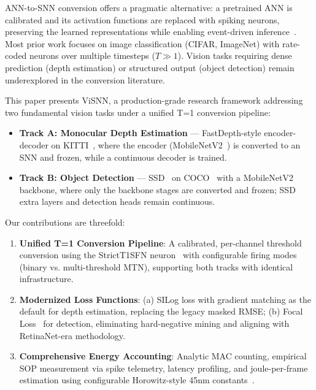 \documentclass[10pt,conference]{IEEEtran}
\begin{document}
ANN-to-SNN conversion offers a pragmatic alternative: a pretrained ANN is calibrated and its activation functions are replaced with spiking neurons, preserving the learned representations while enabling event-driven inference~\cite{cao2015spiking, diehl2015fast, rueckauer2017conversion}. Most prior work focuses on image classification (CIFAR, ImageNet) with rate-coded neurons over multiple timesteps ($T \gg 1$). Vision tasks requiring dense prediction (depth estimation) or structured output (object detection) remain underexplored in the conversion literature.

This paper presents ViSNN, a production-grade research framework addressing two fundamental vision tasks under a unified T=1 conversion pipeline:

\begin{itemize}
    \item \textbf{Track A: Monocular Depth Estimation} — FastDepth-style encoder-decoder on KITTI~\cite{geiger2012we}, where the encoder (MobileNetV2~\cite{sandler2018mobilenetv2}) is converted to an SNN and frozen, while a continuous decoder is trained.
    \item \textbf{Track B: Object Detection} — SSD~\cite{liu2016ssd} on COCO~\cite{lin2014microsoft} with a MobileNetV2 backbone, where only the backbone stages are converted and frozen; SSD extra layers and detection heads remain continuous.
\end{itemize}

Our contributions are threefold:

\begin{enumerate}
    \item \textbf{Unified T=1 Conversion Pipeline}: A calibrated, per-channel threshold conversion using the StrictT1SFN neuron~\cite{kim2023scale} with configurable firing modes (binary vs. multi-threshold MTN), supporting both tracks with identical infrastructure.
    \item \textbf{Modernized Loss Functions}: (a) SILog loss with gradient matching as the default for depth estimation, replacing the legacy masked RMSE; (b) Focal Loss~\cite{lin2017focal} for detection, eliminating hard-negative mining and aligning with RetinaNet-era methodology.
    \item \textbf{Comprehensive Energy Accounting}: Analytic MAC counting, empirical SOP measurement via spike telemetry, latency profiling, and joule-per-frame estimation using configurable Horowitz-style 45nm constants~\cite{horowitz2014computing}.
\end{enumerate}
\end{document}
